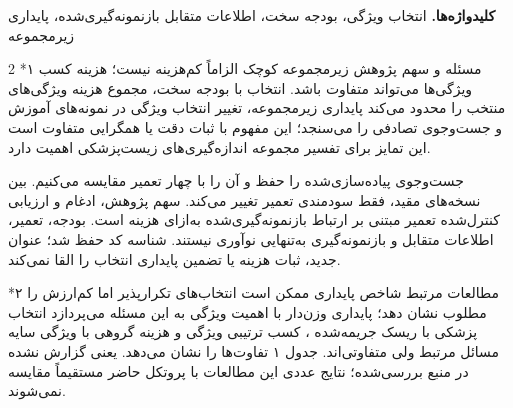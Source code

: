 \documentclass[10pt,a4paper]{article}
\makeatletter
\renewcommand{\section}{\@startsection{section}{1}{0pt}{5pt}{2pt}{\normalfont\normalsize\bfseries}}
\newcommand{\sect}[1]{\section*{#1}}
\makeatother
\begin{document}
\textbf{کلیدواژه‌ها. } انتخاب ویژگی، بودجه سخت، اطلاعات متقابل بازنمونه‌گیری‌شده، پایداری زیرمجموعه
\begin{multicols}{2}\raggedcolumns
\sect{۱  مسئله و سهم پژوهش}
زیرمجموعه کوچک الزاماً کم‌هزینه نیست؛ هزینه کسب ویژگی‌ها می‌تواند متفاوت باشد. انتخاب با بودجه سخت، مجموع هزینه ویژگی‌های منتخب را محدود می‌کند  پایداری زیرمجموعه، تغییر انتخاب ویژگی در نمونه‌های آموزش و جست‌وجوی تصادفی را می‌سنجد؛ این مفهوم با ثبات دقت یا همگرایی متفاوت است  این تمایز برای تفسیر مجموعه اندازه‌گیری‌های زیست‌پزشکی اهمیت دارد.

جست‌وجوی پیاده‌سازی‌شده  را حفظ و آن را با چهار تعمیر مقایسه می‌کنیم. بین نسخه‌های مقید، فقط سودمندی تعمیر تغییر می‌کند. سهم پژوهش، ادغام و ارزیابی کنترل‌شده تعمیر مبتنی بر ارتباط بازنمونه‌گیری‌شده به‌ازای هزینه است. بودجه، تعمیر، اطلاعات متقابل  و بازنمونه‌گیری به‌تنهایی نوآوری نیستند. شناسه کد  حفظ شد؛ عنوان جدید، ثبات هزینه یا تضمین پایداری انتخاب را القا نمی‌کند.

\sect{۲  مطالعات مرتبط}
شاخص پایداری ممکن است انتخاب‌های تکرارپذیر اما کم‌ارزش را مطلوب نشان دهد؛ پایداری وزن‌دار با اهمیت ویژگی به این مسئله می‌پردازد  انتخاب پزشکی با ریسک جریمه‌شده \lr{[5]}، کسب ترتیبی ویژگی \lr{[6]} و هزینه گروهی با ویژگی سایه \lr{[7]} مسائل مرتبط ولی متفاوتی‌اند. جدول ۱ تفاوت‌ها را نشان می‌دهد.  یعنی گزارش نشده در منبع بررسی‌شده؛ نتایج عددی این مطالعات با پروتکل حاضر مستقیماً مقایسه نمی‌شوند.


\end{multicols}
\end{document}
